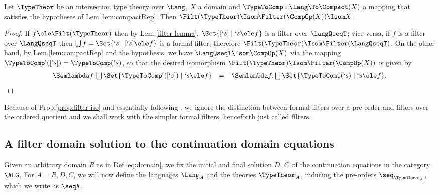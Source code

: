 \documentclass{lmcs}
\begin{document}
 \begin{prop} \label{prop:filter-iso} 
Let $\TypeTheor$ be an intersection type theory over $\Lang$, $X$ a domain and $ \TypeToComp: \Lang \To \Compact(X)$ a mapping that satisfies the hypotheses of Lem.\skp\ref{lem:compactRep}. 
Then $\Filt(\TypeTheor) \Isom \Filter(\CompOp(X)) \Isom X$.
 \end{prop}

 \begin{proof} 
If $f \ele \Filt(\TypeTheor)$ then by Lem.\skp\ref{filter lemma}, $\Set{[`s] \mid `s \ele f}$ is a filter over $\LangQseqT$; vice versa, if $f$ is a filter over $\LangQseqT$ then $\bigcup f = \Set{`s \mid [`s] \ele f}$ is a formal filter; therefore $\Filt(\TypeTheor) \Isom \Filter(\LangQseqT)$. 
On the other hand, by Lem.\skp\ref{lem:compactRep} and the hypothesis, we have $\LangQseqT \Isom \CompOp(X)$ via the mapping $ \TypeToComp'([`s]) = \TypeToComp(`s)$, so that the desired isomorphism $\Filt(\TypeTheor) \Isom\Filter(\CompOp(X))$ is given by 
%
 \[ \begin{array}{rcl} 
 \Semlambda f . \bigsqcup \Set{\TypeToComp'([`s]) \mid `s \ele f} 
	&=& 
 \Semlambda f . \bigsqcup \Set{\TypeToComp(`s) \mid `s \ele f}. 
 \end{array} \]
\arrayqed[-28pt]
 \end{proof}

Because of Prop.\skp\ref{prop:filter-iso} and essentially following \cite{BCD'83}, we ignore the distinction between formal filters over a pre-order and filters over the ordered quotient and we shall work with the simpler formal filters, henceforth just called filters.

 \subsection{A filter domain solution to the continuation domain equations} \label{filter-model-solution}

Given an arbitrary domain $R$ as in Def.\skp\ref{eq:domain}, we fix the initial and final solution $D$, $C$ of the continuation equations in the category $\ALG$. 
For $A = R,D,C$, we will now define the languages $\Lang_A$ and the theories $\TypeTheor_A$, inducing the pre-orders $\seq_{\TypeTheor_A}$, which we write as $\seqA$. 
\end{document}
